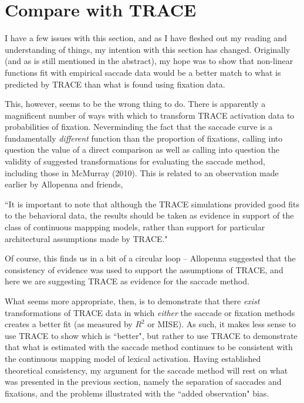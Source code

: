 \documentclass{article}
\begin{document}
\section{Compare with TRACE}

I have a few issues with this section, and as I have fleshed out my reading and understanding of things, my intention with this section has changed. Originally (and as is still mentioned in the abstract), my hope was to show that non-linear functions fit with empirical saccade data would be a better match to what is predicted by TRACE than what is found using fixation data. 

This, however, seems to be the wrong thing to do. There is apparently a magnificent number of ways with which to transform TRACE activation data to probabilities of fixation. Neverminding the fact that the saccade curve is a fundamentally \textit{different} function than the proportion of fixations, calling into question the value of a direct comparison as well as calling into question the validity of suggested transformations for evaluating the saccade method, including those in McMurray (2010). This is related to an observation made earlier by Allopenna and friends, 

``It is important to note that although the TRACE simulations provided good fits to the behavioral data, the results should be taken as evidence in support of the class of continuous mappping models, rather than support for particular architectural assumptions made by TRACE."

Of course, this finds us in a bit of a circular loop -- Allopenna suggested that the consistency of evidence was used to support the assumptions of TRACE, and here we are suggesting TRACE as evidence for the saccade method.

What seems more appropriate, then, is to demonstrate that there \textit{exist} transformations of TRACE data in which \textit{either} the saccade or fixation methods creates a better fit (as measured by $R^2$ or MISE). As such, it makes less sense to use TRACE to show which is ``better", but rather to use TRACE to demonstrate that what is estimated with the saccade method continues to be consistent with the continuous mapping model of lexical activation. Having established theoretical consistency, my argument for the saccade method will rest on what was presented in the previous section, namely the separation of saccades and fixations, and the problems illustrated with the ``added observation" bias. 
\end{document}
